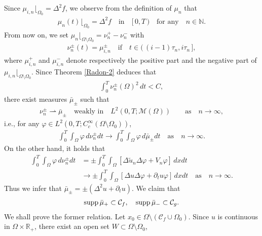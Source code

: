 \documentclass[12pt]{amsart}
\begin{document}
Since $\mu_{i,n} \lfloor_{\Omega_0} = \Delta^2 f$, we observe from the definition of $\mu_n$ that 
\begin{align*}
\mu_n(t) \lfloor_{\Omega_0} = \Delta^2 f \quad \text{in} \quad [\, 0,T \,) \quad \text{for any} \quad n \in {\mathbb{N}}. 
\end{align*}
From now on, we set $\mu_n \lfloor_{\Omega \setminus \Omega_0} = \nu^{+}_{n} - \nu^{-}_{n}$ with 
\begin{align*}
\nu^{\pm}_{n}(t) = \mu^{\pm}_{i,n} \quad \text{if} \quad t \in (\, (i-1) \tau_n, i \tau_n \,],  
\end{align*}
where $\mu^{+}_{i,n}$ and $\mu^{-}_{i,n}$ denote respectively the positive part and the negative part of 
$\mu_{i,n} \lfloor_{\Omega \setminus \Omega_0}$. 
Since Theorem \ref{Radon-2} deduces that 
\begin{align*}
\int^T_0 \nu^{\pm}_{n}(\Omega)^2 \, dt < C, 
\end{align*}
there exist measures $\bar{\mu}_{\pm}$ such that 
\begin{align*}
\nu^{\pm}_{n} \rightharpoonup \bar{\mu}_{\pm} \quad \text{weakly in} \quad L^2(0,T;{\mathcal{M}}(\Omega)) \quad 
\quad \text{as} \quad n \to \infty, 
\end{align*}
i.e., for any ${\varphi} \in L^2(0,T; C^{\infty}_c(\Omega \setminus \Omega_0))$, 
\begin{align*}
\int^T_0 \!\!\! \int_\Omega {\varphi} \, d \nu^{\pm}_{n} dt \to \int^T_0 \!\!\! \int_\Omega {\varphi} \, d \bar{\mu}_{\pm} dt 
\quad \text{as} \quad n \to \infty. 
\end{align*}
On the other hand, it holds that  
\begin{align*}
\int^T_0 \!\!\! \int_\Omega {\varphi} \, d \nu^{\pm}_n dt 
& = \pm \int^T_0 \!\!\! \int_\Omega \left[ \Delta \tilde{u}_n \Delta {\varphi} + V_n {\varphi} \right] \, dx dt  \\
& \to \pm  \int^T_0 \!\!\! \int_\Omega \left[ \Delta u \Delta {\varphi} + {\partial}_t u {\varphi} \right] \, dx dt 
\quad \text{as} \quad n \to \infty. 
\end{align*}
Thus we infer that $\bar{\mu}_{\pm} = \pm(\Delta^2 u + {\partial}_t u)$. 
We claim that 
\begin{align} \label{mu-supp-1}
{\rm supp}\, \bar{\mu}_{+} \subset {\mathcal{C}}_f, \quad {\rm supp}\, \bar{\mu}_{-} \subset {\mathcal{C}}_g. 
\end{align}
We shall prove the former relation. Let $x_0 \in \Omega \setminus ({\mathcal{C}}_f \cup \Omega_0)$. 
Since $u$ is continuous in $\Omega \times {\mathbb{R}}_+$, there exist an open set $W \subset \Omega \setminus \Omega_0$, 
\end{document}
